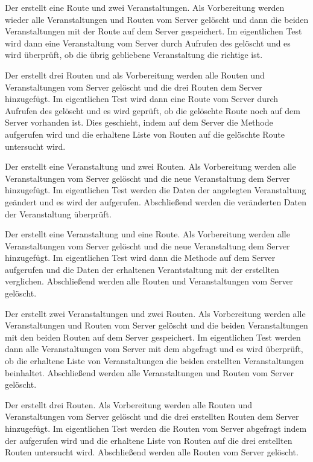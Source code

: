 Der  erstellt eine Route und zwei Veranstaltungen. Als Vorbereitung werden wieder alle Veranstaltungen und Routen vom Server gelöscht und dann die beiden Veranstaltungen mit der Route auf dem Server gespeichert. Im eigentlichen Test wird dann eine Veranstaltung vom Server durch Aufrufen des  gelöscht und es wird überprüft, ob die übrig gebliebene Veranstaltung die richtige ist.

Der  erstellt drei Routen und als Vorbereitung werden alle Routen und Veranstaltungen vom Server gelöscht und die drei Routen dem Server hinzugefügt. Im eigentlichen Test wird dann eine Route vom Server durch Aufrufen des  gelöscht und es wird geprüft, ob die gelöschte Route noch auf dem Server vorhanden ist. Dies geschieht, indem auf dem Server die  Methode aufgerufen wird und die erhaltene Liste von Routen auf die gelöschte Route untersucht wird.

Der  erstellt eine Veranstaltung und zwei Routen. Als Vorbereitung werden alle Veranstaltungen vom Server gelöscht und die neue Veranstaltung dem Server hinzugefügt. Im eigentlichen Test werden die Daten der angelegten Veranstaltung geändert und es wird der  aufgerufen. Abschließend werden die veränderten Daten der Veranstaltung überprüft. 

Der  erstellt eine Veranstaltung und eine Route. Als Vorbereitung werden alle Veranstaltungen vom Server gelöscht und die neue Veranstaltung dem Server hinzugefügt. Im eigentlichen Test wird dann die  Methode auf dem Server aufgerufen und die Daten der erhaltenen Verantstaltung mit der erstellten verglichen. Abschließend werden alle Routen und Veranstaltungen vom Server gelöscht.

Der  erstellt zwei Veranstaltungen und zwei Routen. Als Vorbereitung werden alle Veranstaltungen und Routen vom Server gelöscht und die beiden Veranstaltungen mit den beiden Routen auf dem Server gespeichert. Im eigentlichen Test werden dann alle Veranstaltungen vom Server mit dem  abgefragt und es wird überprüft, ob die erhaltene Liste von Veranstaltungen die beiden erstellten Veranstaltungen beinhaltet. Abschließend werden alle Veranstaltungen und Routen vom Server gelöscht. 

Der  erstellt drei Routen. Als Vorbereitung werden alle Routen und Veranstaltungen vom Server gelöscht und die drei erstellten Routen dem Server hinzugefügt. Im eigentlichen Test werden die Routen vom Server abgefragt indem der  aufgerufen wird und die erhaltene Liste von Routen auf die drei erstellten Routen untersucht wird. Abschließend werden alle Routen vom Server gelöscht.

